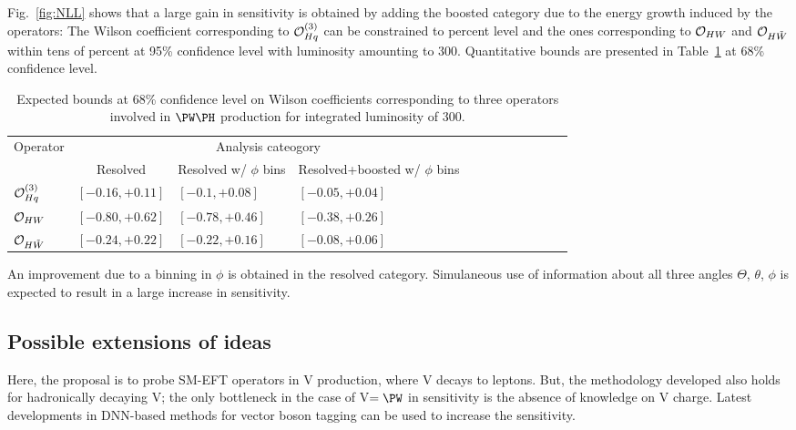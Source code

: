 \documentclass[a4paper,11pt]{article}
\renewcommand{\PV}{{{{V}}}\xspace}
\newcommand{\VH}{{{\PV}{\PH}}\xspace}
\begin{document}
Fig.~\ref{fig:NLL} shows that a large gain in sensitivity is obtained by adding the boosted category due to the energy growth induced by the operators:
The Wilson coefficient corresponding to ${\cal O}^{(3)}_{Hq}$ can be constrained to percent level and the ones corresponding to ${\cal O}_{HW}$ and ${\cal O}_{H\tilde{W}}$ within tens of percent at 95\% confidence level with luminosity amounting to 300\fbinv. 
Quantitative bounds are presented in Table~\ref{Tab:Limits} at 68\% confidence level.
{\renewcommand{\arraystretch}{1.3}
\begin{table}[htbp]
\caption{Expected bounds at 68\% confidence level on Wilson coefficients corresponding to three operators involved in $\PW\PH$ production for integrated luminosity of 300\fbinv.}
\begin{tabular}{lcl lcl lcl lcl}
\multirow{2}{*}{Operator} &
     \multicolumn{3}{c}{Analysis cateogory} \\
    & Resolved & Resolved w/ $\phi$ bins & Resolved+boosted w/ $\phi$ bins \\
    ${\cal O}^{(3)}_{Hq}$    & $\left[-0.16,+0.11\right]$   & $\left[-0.1,+0.08\right]$  & $\left[-0.05,+0.04\right]$ \\
	${\cal O}_{HW}$          & $\left[-0.80,+0.62\right]$   & $\left[-0.78,+0.46\right]$  & $\left[-0.38,+0.26\right]$ \\
	${\cal O}_{H\tilde{W}}$  & $\left[-0.24,+0.22\right]$  &  $\left[-0.22,+0.16\right]$  & $\left[-0.08,+0.06\right]$ \\
  \end{tabular}
\label{Tab:Limits}
\end{table}
An improvement due to a binning in $\phi$ is obtained in the resolved category. 
Simulaneous use of information about all three angles $\Theta$, $\theta$, $\phi$ is expected to result in a large increase in sensitivity. 

\subsection{Possible extensions of ideas}

Here, the proposal is to probe SM-EFT operators in \VH production, where \PV decays to leptons. 
But, the methodology developed also holds for hadronically decaying \PV; 
the only bottleneck in the case of {\PV}$ ={\PW}$ in sensitivity is the absence of knowledge on \PV charge. 
Latest developments in DNN-based methods for vector boson tagging can be used to increase the sensitivity. 

}
\end{document}

